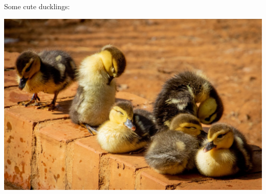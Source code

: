 \documentclass[a0paper,fleqn]{src/betterposter}
\begin{document}
{Some cute ducklings:
\begin{center}
\includegraphics[width=\textwidth]{img/example/ducklings}
\end{center}
}
\end{document}
